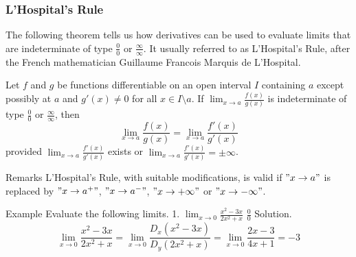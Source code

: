 \documentclass[
  letterpaper,
  DIV=11,
  numbers=noendperiod]{scrartcl}
\begin{document}
\hypertarget{htm:lhospitalsrule}{}
\hypertarget{lhospitals-rule}{%
\subsubsection{L'Hospital's Rule}\label{lhospitals-rule}}

The following theorem tells us how derivatives can be used to evaluate
limits that are indeterminate of type \(\frac{0}{0}\) or
\(\frac{\infty}{\infty}\). It usually referred to as L'Hospital's Rule,
after the French mathematician Guillaume Francois Marquis de L'Hospital.

\leavevmode{}%
Let \(f\) and \(g\) be functions differentiable on an open interval
\(I\) containing \(a\) except possibly at \(a\) and \(g'(x)\ne 0\) for
all \(x \in I \setminus {a}\). If
\(\displaystyle\lim_{x \to a}\frac{f(x)}{g(x)}\) is indeterminate of
type \(\frac{0}{0}\) or \(\frac{\infty}{\infty}\), then \[
\displaystyle\lim_{x \to a}\frac{f(x)}{g(x)}=\displaystyle\lim_{x \to a}\frac{f'(x)}{g'(x)}
\] provided \(\displaystyle\lim_{x \to a}\frac{f'(x)}{g'(x)}\) exists or
\(\displaystyle\lim_{x \to a}\frac{f'(x)}{g'(x)}=\pm \infty\).

\leavevmode{}%
Remarks L'Hospital's Rule, with suitable modifications, is valid if
\("x \to a"\) is replaced by \("x \to a^+"\), \("x \to a^-"\),
\("x \to +\infty"\) or \("x \to -\infty"\).

\leavevmode{}%
Example Evaluate the following limits. 1.
\(\displaystyle\lim_{x \to 0} \frac{x^2-3x}{2x^2+x}\) \(\frac{0}{0}\)
Solution. \[
\displaystyle\lim_{x \to 0} \frac{x^2-3x}{2x^2+x}=\displaystyle\lim_{x \to 0} \frac{D_x\left(x^2-3x\right)}{D_y\left(2x^2+x\right)}=\displaystyle\lim_{x \to 0} \frac{2x-3}{4x+1}=-3
\]
\end{document}
